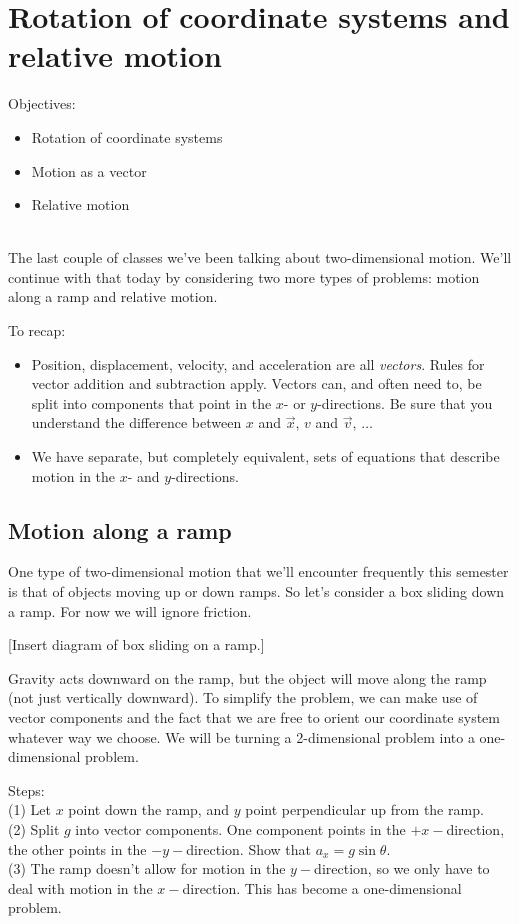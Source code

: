 \section{Rotation of coordinate systems and relative motion}
Objectives:
\begin{itemize}
\item Rotation of coordinate systems
\item Motion as a vector
\item Relative motion
\end{itemize}
\hrulefill\\

The last couple of classes we've been talking about two-dimensional motion. We'll continue with that today by considering two more types of problems: motion along a ramp and relative motion.

To recap:
\begin{itemize}
\item Position, displacement, velocity, and acceleration are all \textit{vectors}. Rules for vector addition and subtraction apply. Vectors can, and often need to, be split into components that point in the $x$- or $y$-directions. Be sure that you understand the difference between $x$ and $\vec x$, $v$ and $\vec v$, $\ldots$
\item We have separate, but completely equivalent, sets of equations that describe motion in the $x$- and $y$-directions.
\end{itemize}

\subsection{Motion along a ramp}

One type of two-dimensional motion that we'll encounter frequently this semester is that of objects moving up or down ramps. So let's consider a box sliding down a ramp. For now we will ignore friction.

[Insert diagram of box sliding on a ramp.]
\vspace{5cm}

Gravity acts downward on the ramp, but the object will move along the ramp (not just vertically downward). To simplify the problem, we can make use of vector components and the fact that we are free to orient our coordinate system whatever way we choose. We will be turning a 2-dimensional problem into a one-dimensional problem.

Steps:\\
(1) Let $x$ point down the ramp, and $y$ point perpendicular up from the ramp.\\
(2) Split $g$ into vector components. One component points in the $+x-$direction, the other points in the $-y-$direction. Show that $a_x=g\sin\theta$.\\
(3) The ramp doesn't allow for motion in the $y-$direction, so we only have to deal with motion in the $x-$direction. This has become a one-dimensional problem.

